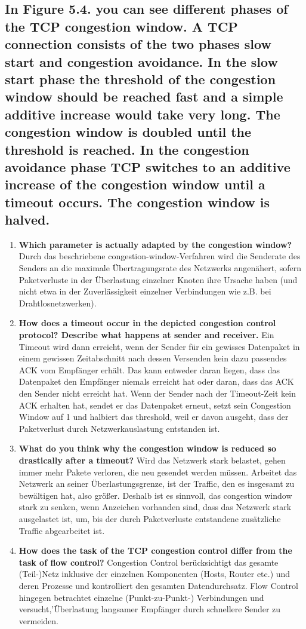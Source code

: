 \documentclass[a4paper,
			llpt,
			solution,
			accentcolor=tud2d,
			colorbacktitle
			]
			{tudexercise}
\begin{document}
\subsection{In Figure 5.4. you can see different phases of the TCP congestion window. A TCP connection consists of the two phases slow start and congestion avoidance. In the slow start phase the threshold of the congestion window should be reached fast and a simple additive increase would take very long. The congestion window is doubled until the threshold is reached. In the congestion avoidance phase TCP switches to an additive increase of the congestion window until a timeout occurs. The congestion window is halved.}
\begin{enumerate}
\item \textbf{Which parameter is actually adapted by the congestion window?} Durch das beschriebene congestion-window-Verfahren wird die Senderate des Senders an die maximale Übertragungsrate des Netzwerks angenähert, sofern Paketverluste in der Überlastung einzelner Knoten ihre Ursache haben (und nicht etwa in der Zuverlässigkeit einzelner Verbindungen wie z.B. bei Drahtlosnetzwerken).
\item \textbf{How does a timeout occur in the depicted congestion control protocol? Describe what
happens at sender and receiver.} Ein Timeout wird dann erreicht, wenn der Sender für ein gewisses Datenpaket in einem gewissen Zeitabschnitt nach dessen Versenden kein dazu passendes ACK vom Empfänger erhält. Das kann entweder daran liegen, dass das Datenpaket den Empfänger niemals erreicht hat oder daran, dass das ACK den Sender nicht erreicht hat. Wenn der Sender nach der Timeout-Zeit kein ACK erhalten hat, sendet er das Datenpaket erneut, setzt sein Congestion Window auf 1 und halbiert das threshold, weil er davon ausgeht, dass der Paketverlust durch Netzwerkauslastung entstanden ist.
\item \textbf{What do you think why the congestion window is reduced so drastically after a timeout?}
Wird das Netzwerk stark belastet, gehen immer mehr Pakete verloren, die neu gesendet werden müssen. Arbeitet das Netzwerk an seiner Überlastungsgrenze, ist der Traffic, den es insgesamt zu bewältigen hat, also größer. Deshalb ist es sinnvoll, das congestion window stark zu senken, wenn Anzeichen vorhanden sind, dass das Netzwerk stark ausgelastet ist, um, bis der durch Paketverluste entstandene zusätzliche Traffic abgearbeitet ist.
\item \textbf{How does the task of the TCP congestion control differ from the task of flow control?}
Congestion Control berücksichtigt das gesamte (Teil-)Netz inklusive der einzelnen Komponenten (Hosts, Router etc.) und deren Prozesse und kontrolliert den gesamten Datendurchsatz.  Flow Control hingegen betrachtet einzelne (Punkt-zu-Punkt-) Verbindungen und versucht,'Überlastung langsamer Empfänger durch schnellere Sender zu vermeiden.
\end{enumerate}
\end{document}
